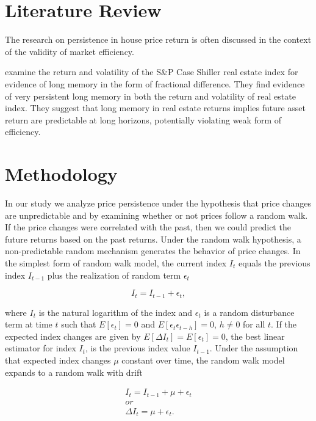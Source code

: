 \documentclass[AEJ,reqno, draftmode]{AEA}
\begin{document}
\section{Literature Review}

The research on persistence in house price return is often discussed in the context of the validity of market efficiency. 

\citet{elder2012persistence} examine the return and volatility of the S\&P Case Shiller real estate index for evidence of long memory in the form of fractional difference. They find evidence of very persistent long memory in both the return and volatility of real estate index. They suggest that long memory in real estate returns implies future asset return are predictable at long horizons, potentially violating weak form of efficiency.






\section{Methodology}

In our study we analyze price persistence under the hypothesis that price changes are unpredictable and by examining whether or not prices follow a random walk. If the price changes were correlated with the past, then we could predict the future returns based on the past returns. Under the random walk hypothesis, a non-predictable random mechanism generates the behavior of price changes. In the simplest form of random walk model, the current index $I_t$ equals the previous index $I_{t-1}$ plus the realization of random term $\epsilon_t$

\begin{equation} \label{eq: a}
    I_t = I_{t-1} + \epsilon_t ,
\end{equation}

where $I_t$ is the natural logarithm of the index and $\epsilon_t$ is a random disturbance term at time $t$ such that $E[\epsilon_t] = 0$ and $E[\epsilon_t\epsilon_{t-h}] = 0$, $h \neq 0$ for all $t$. If the expected index changes are given by $E[\Delta I_t] = E[\epsilon_t] = 0$, the best linear estimator for index $I_t$, is the previous index value $I_{t-1}$. Under the assumption that expected index changes $\mu$ constant over time, the random walk model expands to a random walk with drift

\begin{equation}
\label{eq: b}
    \begin{gathered}
        I_t = I_{t-1} + \mu + \epsilon_t \\ or \\
          \Delta I_t = \mu + \epsilon_t.
      \end{gathered}
\end{equation}
\end{document}
